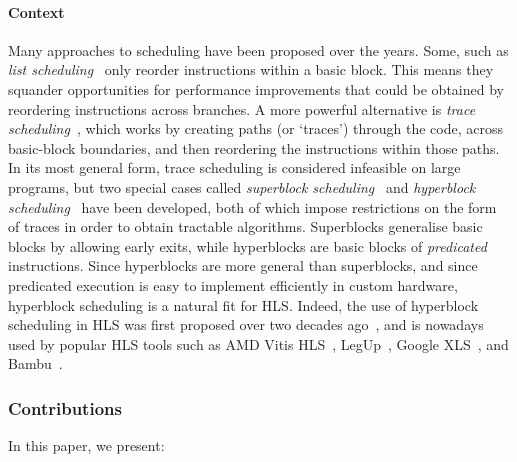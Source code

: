 \paragraph{Context}
Many approaches to scheduling have been proposed over the years. Some, such as
\emph{list scheduling}~\cite[][p.257]{baker19_princ} only reorder instructions
within a basic block. This means they squander opportunities for performance
improvements that could be obtained by reordering instructions across
branches. A more powerful alternative is \emph{trace
  scheduling}~\cite{ellis85_bulld, fisher81_trace_sched}, which works by
creating paths (or `traces') through the code, across basic-block boundaries,
and then reordering the instructions within those paths. In its most general
form, trace scheduling is considered infeasible on large programs, but two
special cases called \emph{superblock scheduling}~\cite{hwu93_super} and
\emph{hyperblock
  scheduling}~\cite{mahlke92_effec_compil_suppor_predic_execut_using_hyper} have
been developed, both of which impose restrictions on the form of traces in order
to obtain tractable algorithms. Superblocks generalise basic blocks by allowing
early exits, while hyperblocks are basic blocks of \emph{predicated}
instructions. Since hyperblocks are more general than superblocks, and since predicated execution is easy to implement efficiently in custom
hardware, hyperblock scheduling is a natural fit for HLS. Indeed, the use of
hyperblock scheduling in HLS was first proposed over two decades
ago~\cite{budiu02_compil_applic_specif_hardw,
  callahan98_instr_level_paral_recon_comput}, and is nowadays used by popular
HLS tools such as AMD Vitis
HLS~\cite{amd23_vitis_forum},  LegUp~\cite[][p.60]{canis15_legup}, Google XLS~\cite[line~112]{googleXLS}, and Bambu~\cite[line~304]{bambu_ifc}.


\subsubsection*{Contributions}

In this paper, we present:

